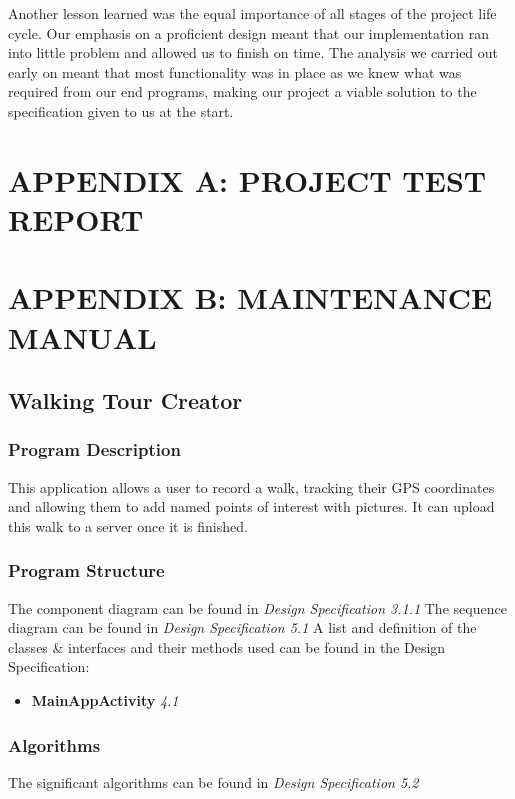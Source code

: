 \documentclass{project}
\begin{document}
Another lesson learned was the equal importance of all stages of the project life cycle. Our emphasis on a proficient design meant that our implementation ran into little problem and allowed us to finish on time. The analysis we carried out early on meant that most functionality was in place as we knew what was required from our end programs, making our project a viable solution to the specification given to us at the start.

\newpage

\section{APPENDIX A: PROJECT TEST REPORT}

\newpage

\section{APPENDIX B: MAINTENANCE MANUAL}

\subsection{Walking Tour Creator}
\subsubsection{Program Description}
This application allows a user to record a walk, tracking their GPS coordinates and allowing them to add named points of interest with pictures. It can upload this walk to a server once it is finished.

\subsubsection{Program Structure}
The component diagram can be found in \textit{Design Specification 3.1.1}
The sequence diagram can be found in \textit{Design Specification 5.1}
A list and definition of the classes \& interfaces and their methods used can be found in the Design Specification:
\begin{itemize}
\item \textbf{MainAppActivity} \textit{4.1}
\end{itemize}

\subsubsection{Algorithms}
The significant algorithms can be found in \textit{Design Specification 5.2}
\end{document}
